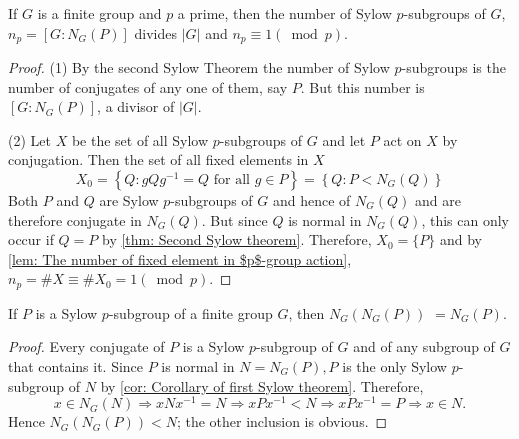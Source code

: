 \begin{theorem}
    If $G$ is a finite group and $p$ a prime, then the number of Sylow $p$-subgroups of $G$, $n_p=\left[G:N_G(P)\right]$ divides $\left|G\right|$ and $n_p\equiv 1 \left(\bmod p\right)$.
    \begin{proof}
        (1)
        By the second Sylow Theorem the number of Sylow $p$-subgroups is the number of conjugates of any one of them, say $P$. But this number is $\left[G: N_G(P)\right]$, a divisor of $|G|$.

        (2)
        Let $X$ be the set of all Sylow $p$-subgroups of $G$ and let $P$ act on $X$ by conjugation.
        Then the set of all fixed elements in $X$
        \begin{equation*}
            X_0
            =
            \left\{Q: gQg^{-1}=Q \text{ for all } g \in P\right\}
            =
            \left\{Q: P <N_G (Q)\right\}
        \end{equation*}
        Both $P$ and $Q$ are Sylow $p$-subgroups of $G$ and hence of $N_G(Q)$ and are therefore conjugate in $N_G(Q)$. But since $Q$ is normal in $N_G(Q)$, this can only occur if $Q=P$ by \ref{thm: Second Sylow theorem}.
        Therefore, $X_0=\{P\}$ and by \ref{lem: The number of fixed element in $p$-group action}, $n_p=\# X \equiv\# X_0=1(\bmod p)$.
    \end{proof}
\end{theorem}
\begin{corollary}
    If $P$ is a Sylow $p$-subgroup of a finite group $G$, then $N_{G}\left(N_{G}(P)\right)$ $=N_{G}(P)$.
    \begin{proof}
        Every conjugate of $P$ is a Sylow $p$-subgroup of $G$ and of any subgroup of $G$ that contains it. Since $P$ is normal in $N=N_G(P), P$ is the only Sylow $p$-subgroup of $N$ by \ref{cor: Corollary of first Sylow theorem}. Therefore,
        \begin{equation*}
            x \in N_G(N) \Rightarrow x N x^{-1}=N \Rightarrow x P x^{-1}<N \Rightarrow x P x^{-1}=P \Rightarrow x \in N .
        \end{equation*}
        Hence $N_G\left(N_G(P)\right)<N$; the other inclusion is obvious.
    \end{proof}
\end{corollary}





\subsection{}

